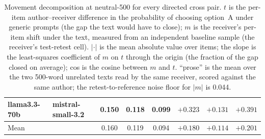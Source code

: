 \begin{table}[H]
\begin{tabular}{llcccccc}
llama3.3-70b & mistral-small-3.2 & 0.150 & 0.118 & 0.099 & $+0.323$ & $+0.131$ & $+0.391$ \\
\midrule
Mean & & 0.160 & 0.119 & 0.094 & $+0.180$ & $+0.114$ & $+0.201$ \\
\bottomrule
\end{tabular}
\caption{Movement decomposition at neutral-500 for every directed cross pair. $t$ is the per-item author--receiver difference in the probability of choosing option~A under generic prompts (the gap the text would have to close); $m$ is the receiver's per-item shift under the text, measured from an independent baseline sample (the receiver's test-retest cell). $|\cdot|$ is the mean absolute value over items; the slope is the least-squares coefficient of $m$ on $t$ through the origin (the fraction of the gap closed on average); cos is the cosine between $m$ and $t$. ``prose'' is the mean over the two 500-word unrelated texts read by the same receiver, scored against the same author; the retest-to-reference noise floor for $|m|$ is 0.044.}
\label{tab:movement}
\end{table}
